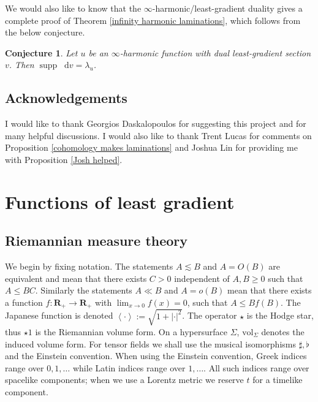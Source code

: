 \documentclass[reqno,12pt,letterpaper]{amsart}
\newcommand{\RR}{\mathbf{R}}
\DeclareMathOperator{\supp}{supp}
\newcommand*\dif{\mathop{}\!\mathrm{d}}
\newcommand{\vol}{\mathrm{vol}}
\def\Japan#1{\left \langle #1 \right \rangle}
\newtheorem{conjecture}[theorem]{Conjecture}
\theoremstyle{definition}
\numberwithin{equation}{section}
\begin{document}
We would also like to know that the $\infty$-harmonic/least-gradient duality gives a complete proof of Theorem \ref{infinity harmonic laminations}, which follows from the below conjecture.

\begin{conjecture}\label{two laminations agree}
Let $u$ be an $\infty$-harmonic function with dual least-gradient section $v$.
Then $\supp \dif v = \lambda_u$.
\end{conjecture}



\subsection{Acknowledgements}
I would like to thank Georgios Daskalopoulos for suggesting this project and for many helpful discussions.
I would also like to thank Trent Lucas for comments on Proposition \ref{cohomology makes laminations} and Joshua Lin for providing me with Proposition \ref{Josh helped}.




\section{Functions of least gradient}\label{LeastGradientFunctions}
\subsection{Riemannian measure theory}
We begin by fixing notation.
The statements $A \lesssim B$ and $A = O(B)$ are equivalent and mean that there exists $C > 0$ independent of $A, B \geq 0$ such that $A \leq BC$.
Similarly the statements $A \ll B$ and $A = o(B)$ mean that there exists a function $f: \RR_+ \to \RR_+$ with $\lim_{x \to 0} f(x) = 0$, such that $A \leq Bf(B)$.
The Japanese function is denoted $\Japan\cdot := \sqrt{1 + |\cdot|^2}$.
The operator $\star$ is the Hodge star, thus $\star 1$ is the Riemannian volume form.
On a hypersurface $\Sigma$, $\vol_\Sigma$ denotes the induced volume form.
For tensor fields we shall use the musical isomorphisms $\sharp, \flat$ and the Einstein convention.
When using the Einstein convention, Greek indices range over $0, 1, \dots$ while Latin indices range over $1, \dots$.
All such indices range over spacelike components; when we use a Lorentz metric we reserve $t$ for a timelike component.
\end{document}
